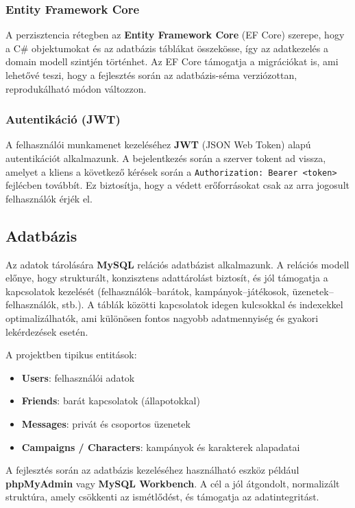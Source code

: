 \documentclass[colorlinks]{thesis-kando}
\theoremstyle{definition}
\theoremstyle{remark}
\begin{document}
	\subsubsection{Entity Framework Core}
	A perzisztencia rétegben az \textbf{Entity Framework Core} (EF Core) szerepe, hogy a C\# objektumokat és az adatbázis táblákat
	összekösse, így az adatkezelés a domain modell szintjén történhet. Az EF Core támogatja a migrációkat is, ami lehetővé teszi, hogy
	a fejlesztés során az adatbázis-séma verziózottan, reprodukálható módon változzon.
	
	\subsubsection{Autentikáció (JWT)}
	A felhasználói munkamenet kezeléséhez \textbf{JWT} (JSON Web Token) alapú autentikációt alkalmazunk. A bejelentkezés során a szerver
	tokent ad vissza, amelyet a kliens a következő kérések során a \texttt{Authorization: Bearer <token>} fejlécben továbbít.
	Ez biztosítja, hogy a védett erőforrásokat csak az arra jogosult felhasználók érjék el.
	
	\subsection{Adatbázis}
	Az adatok tárolására \textbf{MySQL} relációs adatbázist alkalmazunk. A relációs modell előnye, hogy strukturált,
	konzisztens adattárolást biztosít, és jól támogatja a kapcsolatok kezelését (felhasználók--barátok, kampányok--játékosok,
	üzenetek--felhasználók, stb.). A táblák közötti kapcsolatok idegen kulcsokkal és indexekkel optimalizálhatók, ami különösen
	fontos nagyobb adatmennyiség és gyakori lekérdezések esetén.
	
	A projektben tipikus entitások:
	\begin{itemize}
		\item \textbf{Users}: felhasználói adatok
		\item \textbf{Friends}: barát kapcsolatok (állapotokkal)
		\item \textbf{Messages}: privát és csoportos üzenetek
		\item \textbf{Campaigns / Characters}: kampányok és karakterek alapadatai
	\end{itemize}
	
	A fejlesztés során az adatbázis kezeléséhez használható eszköz például \textbf{phpMyAdmin} vagy \textbf{MySQL Workbench}.
	A cél a jól átgondolt, normalizált struktúra, amely csökkenti az ismétlődést, és támogatja az adatintegritást.
	
\end{document}
